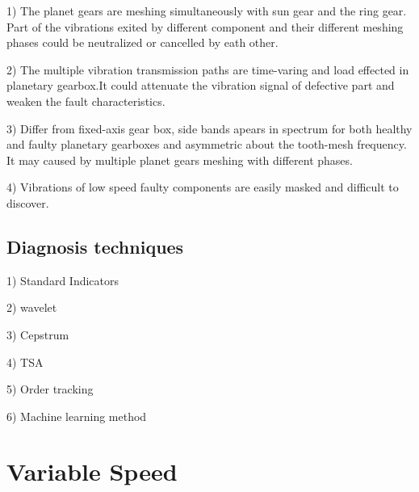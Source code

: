 1) The planet gears are meshing simultaneously with sun gear and the ring gear. Part of the vibrations exited by different component and their different meshing phases could be neutralized or cancelled by eath other.

2) The multiple vibration transmission paths are time-varing and load effected in planetary gearbox.It could attenuate the vibration signal of defective part and weaken the fault characteristics.

3) Differ from fixed-axis gear box, side bands apears in spectrum for both healthy and faulty planetary gearboxes and asymmetric about the tooth-mesh frequency. It may caused by multiple planet gears meshing with different phases.

4) Vibrations of low speed faulty components are easily masked and difficult to discover.



\subsection{Diagnosis techniques}

1)	Standard Indicators

2)	wavelet

3)	Cepstrum

4)	TSA

5)	Order tracking

6)	Machine learning method


\section{Variable Speed}
